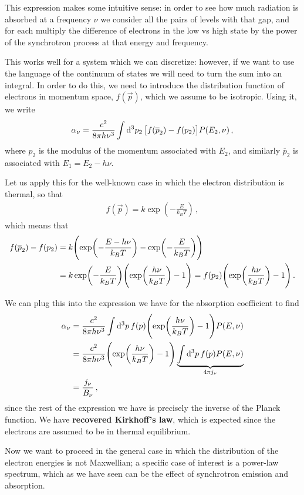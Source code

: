 \documentclass[main.tex]{subfiles}
\begin{document}
This expression makes some intuitive sense: in order to see how much radiation is absorbed at a frequency \(\nu \) we consider all the pairs of levels with that gap, and for each multiply  the difference of electrons in the low vs high state by the power of the synchrotron process at that energy and frequency. 

This works well for a system which we can discretize: however, if we want to use the language of the continuum of states we will need to turn the sum into an integral.
In order to do this, we need to introduce the distribution function of electrons in momentum space, \(f(\vec{p})\), which we assume to be isotropic. Using it, we write 
%
\begin{align}
\alpha _\nu = 
\frac{c^2}{8 \pi h \nu^3}
\int \dd[3]{p_2 } \qty[ f(\overline{p}_2 )- f(p_2 )]P (E_2 , \nu )
\,,
\end{align}
%
where \(p_2 \) is the modulus of the momentum associated with \(E_2 \), and similarly \(\overline{p}_2\) is associated with \(E_1 = E_2 - h \nu \). 

Let us apply this for the well-known case in which the electron distribution is thermal, so that 
%
\begin{align}
f(\vec{p}) = k \exp(- \frac{E}{k_B T})
\,,
\end{align}
%
which means that 
%
\begin{align}
f(\overline{p}_2) - f(p_2) &= k \qty(\exp(- \frac{E - h \nu }{k_B T}) - \exp(- \frac{E}{k_B T}))  \\
&= k \exp(- \frac{E}{k_B T}) \qty(\exp(\frac{h \nu }{k_B T}) - 1)
= f(p_2) \qty(\exp(\frac{h \nu }{k_B T}) - 1)
\,.
\end{align}

We can plug this into the expression we have for the absorption  coefficient  to find 
%
\begin{align}
\alpha _\nu &=
\frac{c^2}{8 \pi h \nu^3} \int \dd[3]{p} f(p) \qty(\exp(\frac{h \nu }{k_B T}) - 1) P(E, \nu )  \\
&= \frac{c^2}{8 \pi h \nu^3} \qty(\exp(\frac{h \nu }{k_B T}) - 1) \underbrace{\int \dd[3]{p} f(p) P(E, \nu ) }_{4 \pi j_\nu }  \\
&= \frac{j_\nu}{B_\nu }
\,,
\end{align}
%
since the rest of the expression we have is precisely the inverse of the Planck function. 
We have \textbf{recovered Kirkhoff's law}, which is expected since the electrons are assumed to be in thermal equilibrium. 

Now we want to proceed in the general case in which the distribution of the electron energies is not Maxwellian; a specific case of interest is a power-law spectrum, which as we have seen can be the effect of synchrotron emission and absorption.
\end{document}
